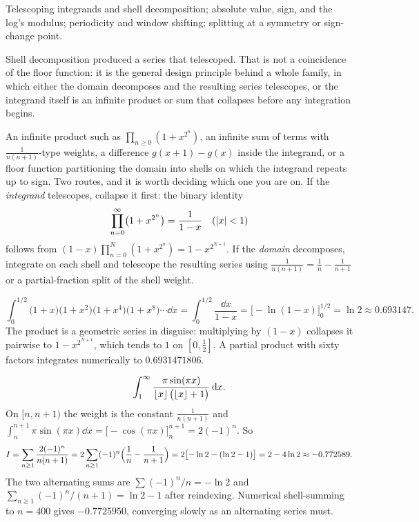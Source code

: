 \begin{seealsob}Telescoping integrands and shell decomposition; absolute value, sign, and the log's modulus; periodicity and window shifting; splitting at a symmetry or sign-change point.\end{seealsob}

Shell decomposition produced a series that telescoped. That is not a coincidence of the floor function: it is the general design principle behind a whole family, in which either the domain decomposes and the resulting series telescopes, or the integrand itself is an infinite product or sum that collapses before any integration begins.

\cue An infinite product such as $\prod_{n\geq0}(1+x^{2^{n}})$, an infinite sum of terms with $\tfrac{1}{n(n+1)}$-type weights, a difference $g(x+1)-g(x)$ inside the integrand, or a floor function partitioning the domain into shells on which the integrand repeats up to sign.
\method Two routes, and it is worth deciding which one you are on. If the \emph{integrand} telescopes, collapse it first: the binary identity
\[\prod_{n=0}^{\infty}\bigl(1+x^{2^{n}}\bigr)=\frac{1}{1-x}\quad(\left\lvert x\right\rvert<1)\]
follows from $(1-x)\prod_{n=0}^{N}(1+x^{2^{n}})=1-x^{2^{N+1}}$. If the \emph{domain} decomposes, integrate on each shell and telescope the resulting series using $\tfrac{1}{n(n+1)}=\tfrac1n-\tfrac{1}{n+1}$ or a partial-fraction split of the shell weight.

\begin{worked}
\[\int_0^{1/2}\bigl(1+x\bigr)\bigl(1+x^{2}\bigr)\bigl(1+x^{4}\bigr)\bigl(1+x^{8}\bigr)\cdots\dd x=\int_0^{1/2}\frac{\dd x}{1-x}=\bigl[-\ln(1-x)\bigr]_0^{1/2}=\ln2\approx0.693147.\]
The product is a geometric series in disguise: multiplying by $(1-x)$ collapses it pairwise to $1-x^{2^{N+1}}$, which tends to $1$ on $[0,\tfrac12]$. A partial product with sixty factors integrates numerically to $0.6931471806$.
\end{worked}

\begin{worked}
\[\int_1^{\infty}\frac{\pi\sin(\pi x)}{\left\lfloor x\right\rfloor\bigl(\left\lfloor x\right\rfloor+1\bigr)}\,\mathrm{d} x.\]
On $[n,n+1)$ the weight is the constant $\tfrac{1}{n(n+1)}$ and $\int_n^{n+1}\pi\sin(\pi x)\dd x=\bigl[-\cos(\pi x)\bigr]_n^{n+1}=2(-1)^{n}$. So
\[I=\sum_{n\geq1}\frac{2(-1)^{n}}{n(n+1)}=2\sum_{n\geq1}(-1)^{n}\Bigl(\frac1n-\frac{1}{n+1}\Bigr)=2\bigl[-\ln2-(\ln2-1)\bigr]=2-4\ln2\approx-0.772589.\]
The two alternating sums are $\sum(-1)^{n}/n=-\ln2$ and $\sum_{n\geq1}(-1)^{n}/(n+1)=\ln2-1$ after reindexing. Numerical shell-summing to $n=400$ gives $-0.7725950$, converging slowly as an alternating series must.
\end{worked}

